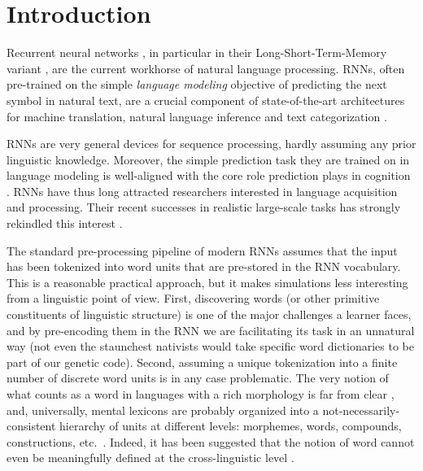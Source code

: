 \section{Introduction}
\label{sec:introduction}


Recurrent neural networks \cite[RNNs,][]{Elman:1990}, in particular
in their Long-Short-Term-Memory variant
\cite[LSTMs,][]{Hochreiter:Schmidhuber:1997}, are the current
workhorse of natural language processing. RNNs, often
pre-trained on the simple \emph{language modeling} objective of
predicting the next symbol in natural text, are a crucial
component of state-of-the-art architectures for machine
translation, natural language inference and text categorization
\cite{Goldberg:2017}.

RNNs are very general devices for sequence processing, hardly assuming
any prior linguistic knowledge. Moreover, the simple prediction task
they are trained on in language modeling is well-aligned with the
core role prediction plays in cognition
\cite[e.g.,][]{Bar:2007,Clark:2016}. RNNs have thus long attracted
researchers interested in language acquisition and processing. Their
recent successes in realistic large-scale tasks has strongly rekindled
this interest \cite[see, e.g.,][and references
there]{Frank:etal:2013,Lau:etal:2017,Kirov:Cotterell:2018,Linzen:etal:2018,McCoy:etal:2018,Pater:2018}.

The standard pre-processing pipeline of modern RNNs assumes that the
input has been tokenized into word units that are pre-stored in the
RNN vocabulary. This is a reasonable practical approach, but it makes
simulations less interesting from a linguistic point of view. First,
discovering words (or other primitive constituents of linguistic structure) is one of the major challenges a learner faces, and
by pre-encoding them in the RNN we are facilitating its task in an
unnatural way (not even the staunchest nativists would take specific
word dictionaries to be part of our genetic code). Second, assuming a
unique tokenization into a finite number of discrete word units is in
any case problematic. The very notion of what counts as a word in
languages with a rich morphology is far from clear
\cite[e.g.,][]{Bickel:Zuniga:2017}, and, universally, mental lexicons
are probably organized into a not-necessarily-consistent hierarchy of
units at different levels: morphemes, words, compounds, constructions,
etc.~\cite[e.g.,][]{Goldberg:2005}. Indeed, it has been suggested that
the notion of word cannot even be meaningfully defined at the
cross-linguistic level \cite{Haspelmath:2011}.

